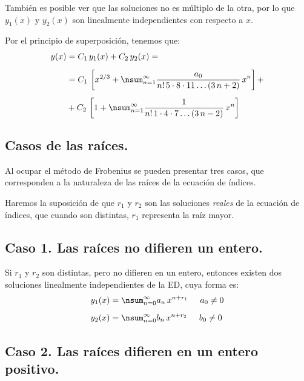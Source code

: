 \par
También es posible ver que las soluciones no es múltiplo de la otra, por lo que $y_{1}(x)$ y $y_{2}(x)$ son linealmente independientes con respecto a $x$.
\par
Por el principio de superposición, tenemos que:
\begin{align*}
y (x) &= C_{1} \, y_{1} (x) + C_{2} \, y_{2} (x) = \\[0.5em]
&= C_{1} \, \left[ x^{2/3} + \nsum_{n=1}^{\infty} \dfrac{a_{0}}{n! \, 5 \cdot 8 \cdot 11 \ldots (3\, n + 2)} \, x^{n} \right] + \\[0.5em]
&+ C_{2} \, \left[ 1 + \nsum_{n=1}^{\infty} \dfrac{1}{n! \, 1 \cdot 4 \cdot 7 \ldots (3\, n - 2)} \, x^{n} \right]
\end{align*}

\subsection{Casos de las raíces.}

Al ocupar el método de Frobenius se pueden presentar tres casos, que corresponden a la naturaleza de las raíces de la ecuación de índices.
\par
Haremos la suposición de que $r_{1}$ y $r_{2}$ son las soluciones \emph{reales} de la ecuación de índices, que cuando son distintas, $r_{1}$ representa la raíz mayor.

\subsection*{Caso 1. Las raíces no difieren un entero.}

Si $r_{1}$ y $r_{2}$ son distintas, pero no difieren  en un entero, entonces existen dos soluciones linealmente independientes de la ED, cuya forma es:
\begin{subequations}
\begin{align}
y_{1} (x) &= \nsum_{n=0}^{\infty} a_{n} \, x^{n+r_{1}} \hspace{0.5cm} a_{0} \neq 0 \label{eq:ecuacion_14a} \\[0.5em]
y_{2} (x) &= \nsum_{n=0}^{\infty} b_{n} \, x^{n+r_{2}} \hspace{0.5cm} b_{0} \neq 0 \label{eq:ecuacion_14b}
\end{align}
\end{subequations}

\subsection*{Caso 2. Las raíces difieren en un entero positivo.}

